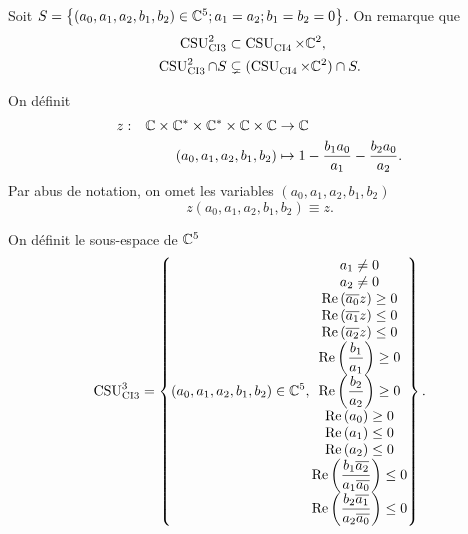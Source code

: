   Soit \(S = \left\lbrace (a_0,a_1,a_2,b_1,b_2) \in \CC^5 ; a_1 = a_2 ; b_1 = b_2 = 0 \right\rbrace \). On remarque que
  \begin{align}
    \CSU[2]{CI3} & \subset \CSU{CI4}\times\CC^2,
    \\
    \CSU[2]{CI3}\cap S & \subsetneq (\CSU{CI4}\times\CC^2)\cap S. 
  \end{align}

    On définit 
    \begin{equation}
      \label{eq:fonction:z-ci3}
      \fonction{z}{\CC\times\CC^*\times\CC^*\times \CC \times \CC}{\CC}%
        {(a_0,a_1,a_2,b_1,b_2)}{1 - \frac{b_1a_0}{a_1} - \frac{b_2a_0}{a_2}.}
    \end{equation}
    Par abus de notation, on omet les variables \( (a_0,a_1,a_2,b_1,b_2)\)
    \begin{equation}
       z(a_0,a_1,a_2,b_1,b_2) \equiv z.
    \end{equation}
  \begin{defn}
    \label{def:csu:ci3-3}

    On définit le sous-espace  de \(\CC^5\)
    \begin{equation*}
      \CSU[3]{CI3} = \left\lbrace
      (a_0,a_1,a_2,b_1,b_2) \in \CC^5,
      \begin{matrix}
        a_1 \not = 0
        \\
        a_2 \not = 0
        \\
        \Re\left(\conj{a_0}z\right) \ge 0
        \\
        \Re\left(\conj{a_1}z\right) \le 0
        \\
        \Re\left(\conj{a_2}z\right) \le 0
        \\
        \Re\left(\frac{b_1}{a_1}\right) \ge 0
        \\
        \Re\left(\frac{b_2}{a_2}\right) \ge 0
        \\
        \Re\left(a_0\right) \ge 0
        \\
        \Re\left(a_1\right) \le 0
        \\
        \Re\left(a_2\right) \le 0
        \\
        \Re\left(\frac{b_1\conj{a_2}}{a_1\conj{a_0}}\right) \le 0
        \\
        \Re\left(\frac{b_2\conj{a_1}}{a_2\conj{a_0}}\right) \le 0
      \end{matrix}
      \right\rbrace.
    \end{equation*}
  \end{defn}

